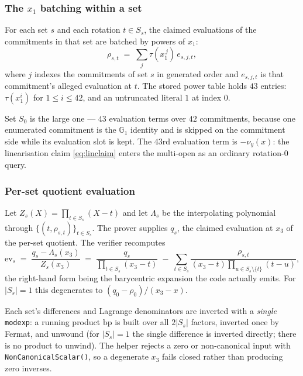 \documentclass[11pt,a4paper]{article}
\newcommand{\Gone}{\ensuremath{\mathbb{G}_{1}}}
\newcommand{\trunc}{\ensuremath{\tau}}
\newcommand{\code}[1]{\texttt{#1}}
\newcommand{\err}[1]{\textcolor{red!60!black}{\texttt{#1}}}
\theoremstyle{definition}
\begin{document}
\subsubsection{The \texorpdfstring{$x_1$}{x1} batching within a set}

For each set $s$ and each rotation $t \in S_s$, the claimed evaluations of the
commitments in that set are batched by powers of $x_1$:
\begin{equation}
\rho_{s,t} \;=\; \sum_{j} \trunc\!\left(x_1^{\,j}\right)\, e_{s,j,t},
\label{eq:rho}
\end{equation}
where $j$ indexes the commitments of set $s$ in generated order and $e_{s,j,t}$
is that commitment's alleged evaluation at $t$. The stored power table holds
$43$ entries: $\trunc(x_1^{i})$ for $1 \le i \le 42$, and an untruncated
literal $1$ at index $0$.

Set $S_0$ is the large one --- $43$ evaluation terms over $42$ commitments,
because one enumerated commitment is the $\Gone$ identity and is skipped on the
commitment side while its evaluation slot is kept. The $43$rd evaluation term
is $-\nu_y(x)$: the linearisation claim \eqref{eq:linclaim} enters the
multi-open as an ordinary rotation-$0$ query.

\subsubsection{Per-set quotient evaluation}

Let $Z_s(X) = \prod_{t \in S_s}(X-t)$ and let $\Lambda_s$ be the interpolating
polynomial through $\{(t,\rho_{s,t})\}_{t \in S_s}$. The prover supplies
$q_s$, the claimed evaluation at $x_3$ of the per-set quotient. The verifier
recomputes
\begin{equation}
\mathrm{ev}_s
\;=\;
\frac{q_s - \Lambda_s(x_3)}{Z_s(x_3)}
\;=\;
\frac{q_s}{\prod_{t\in S_s}(x_3-t)}
\;-\;
\sum_{t \in S_s}
\frac{\rho_{s,t}}{(x_3-t)\prod_{u \in S_s\setminus\{t\}}(t-u)},
\label{eq:evs}
\end{equation}
the right-hand form being the barycentric expansion the code actually emits.
For $|S_s| = 1$ this degenerates to $(q_0-\rho_{0})/(x_3-x)$.

Each set's differences and Lagrange denominators are inverted with a
\emph{single} \code{modexp}: a running product $\mathrm{bp}$ is built over all
$2|S_s|$ factors, inverted once by Fermat, and unwound (for $|S_s| = 1$ the
single difference is inverted directly; there is no product to unwind). The helper rejects a
zero or non-canonical input with \err{NonCanonicalScalar()}, so a degenerate
$x_3$ fails closed rather than producing zero inverses.
\end{document}
